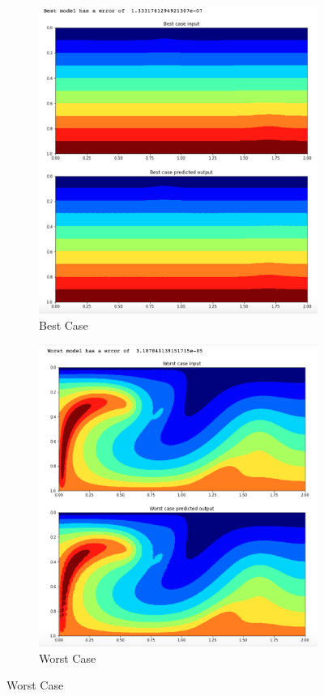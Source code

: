 \begin{figure}[H]
\centering
\begin{subfigure}{0.45\textwidth}
    \includegraphics[width=\textwidth]{Report LaTeX/figures/mantle_convection_images/larger_dataset_interpolated/ConvAE_Best.png}
    \caption{Best Case}
    \label{fig:first}
\end{subfigure}
\hfill
\begin{subfigure}{0.45\textwidth}
    \includegraphics[width=\textwidth]{Report LaTeX/figures/mantle_convection_images/larger_dataset_interpolated/ConvAE_Worst.png}
    \caption{Worst Case}
    \label{fig:second}
\end{subfigure}
        

\end{figure}
